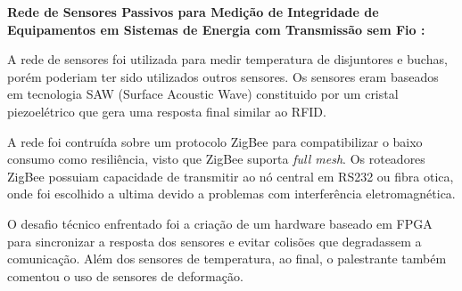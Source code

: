 
\textbf{Rede de Sensores Passivos para Medição de Integridade de Equipamentos em
Sistemas de Energia com Transmissão sem Fio :}

A rede de sensores foi utilizada para medir temperatura de disjuntores e buchas,
porém poderiam ter sido utilizados outros sensores. Os sensores eram baseados em
tecnologia SAW (Surface Acoustic Wave) constituido por um cristal piezoelétrico
que gera uma resposta final similar ao RFID.

A rede foi contruída sobre um protocolo ZigBee para compatibilizar o baixo
consumo como resiliência, visto que ZigBee suporta \textit{full mesh}. Os
roteadores ZigBee possuiam capacidade de transmitir ao nó central em RS232 ou
fibra otica, onde foi escolhido a ultima devido a problemas com interferência
eletromagnética.

O desafio técnico enfrentado foi a criação de um hardware baseado em FPGA para
sincronizar a resposta dos sensores e evitar colisões que degradassem a
comunicação. Além dos sensores de temperatura, ao final, o palestrante também
comentou o uso de sensores de deformação.
